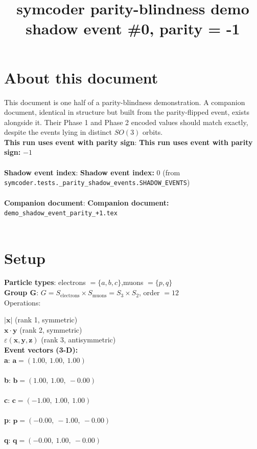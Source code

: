 \documentclass[a4paper,11pt]{article}
\title{symcoder parity-blindness demo\\\large shadow event \#0,  parity = -1}
\date{}
\newcommand{\vc}[1]{\ensuremath{\mathbf{#1}}}
\newcommand{\dnfagmiihhiejm}[1]{|\vc{#1}|}
\newcommand{\pdcegfomjfhook}[2]{\mathbf{#1} \cdot \mathbf{#2}}
\newcommand{\kblbmcpggoncpf}[3]{\varepsilon(\mathbf{#1},\mathbf{#2},\mathbf{#3})}
\begin{document}
\maketitle

\section{About this document}
This document is one half of a parity-blindness demonstration.  A companion document, identical in structure but built from the parity-flipped event, exists alongside it.  Their Phase 1 and Phase 2 encoded values should match exactly, despite the events lying in distinct $SO(3)$ orbits.\\[1ex]
\textbf{This run uses event with parity sign}: \textbf{This run uses event with parity sign:} $-1$\\\\
\textbf{Shadow event index}: \textbf{Shadow event index:} $0$ (from \texttt{symcoder.tests.\_parity\_shadow\_events.SHADOW\_EVENTS})\\\\
\textbf{Companion document}: \textbf{Companion document:} \texttt{demo\_shadow\_event\_parity\_+1.tex}\\\\

\section{Setup}
\textbf{Particle types}: electrons $= \{a, b, c\}$,\quad muons $= \{p, q\}$\\
\textbf{Group G}: $G = S_{\text{electrons}} \times S_{\text{muons}} = S_{3} \times S_{2}$, order $= 12$\\

Operations:

$\dnfagmiihhiejm{x}$ \quad (rank 1, symmetric)\\
$\pdcegfomjfhook{x}{y}$ \quad (rank 2, symmetric)\\
$\kblbmcpggoncpf{x}{y}{z}$ \quad (rank 3, antisymmetric)\\

\textbf{Event vectors (3-D):}\\
\textbf{  a}: $\vc{a} = (1.00,\ 1.00,\ 1.00)$\\\\
\textbf{  b}: $\vc{b} = (1.00,\ 1.00,\ -0.00)$\\\\
\textbf{  c}: $\vc{c} = (-1.00,\ 1.00,\ 1.00)$\\\\
\textbf{  p}: $\vc{p} = (-0.00,\ -1.00,\ -0.00)$\\\\
\textbf{  q}: $\vc{q} = (-0.00,\ 1.00,\ -0.00)$\\\\
\end{document}
